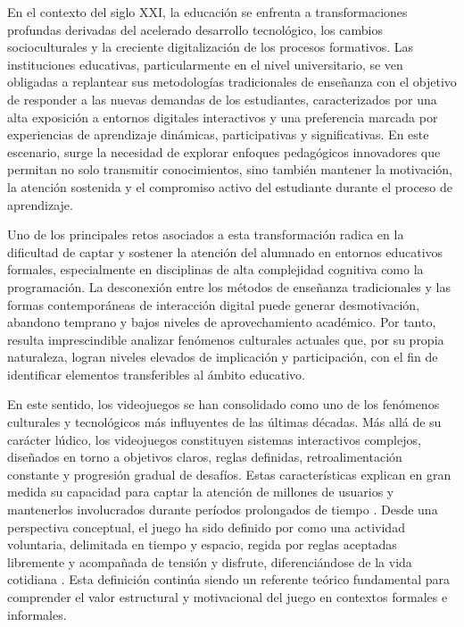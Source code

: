 En el contexto del siglo XXI, la educación se enfrenta a transformaciones profundas derivadas del acelerado desarrollo tecnológico, los cambios socioculturales y la creciente digitalización de los procesos formativos. Las instituciones educativas, particularmente en el nivel universitario, se ven obligadas a replantear sus metodologías tradicionales de enseñanza con el objetivo de responder a las nuevas demandas de los estudiantes, caracterizados por una alta exposición a entornos digitales interactivos y una preferencia marcada por experiencias de aprendizaje dinámicas, participativas y significativas. En este escenario, surge la necesidad de explorar enfoques pedagógicos innovadores que permitan no solo transmitir conocimientos, sino también mantener la motivación, la atención sostenida y el compromiso activo del estudiante durante el proceso de aprendizaje.

Uno de los principales retos asociados a esta transformación radica en la dificultad de captar y sostener la atención del alumnado en entornos educativos formales, especialmente en disciplinas de alta complejidad cognitiva como la programación. La desconexión entre los métodos de enseñanza tradicionales y las formas contemporáneas de interacción digital puede generar desmotivación, abandono temprano y bajos niveles de aprovechamiento académico. Por tanto, resulta imprescindible analizar fenómenos culturales actuales que, por su propia naturaleza, logran niveles elevados de implicación y participación, con el fin de identificar elementos transferibles al ámbito educativo.

En este sentido, los videojuegos se han consolidado como uno de los fenómenos culturales y tecnológicos más influyentes de las últimas décadas. Más allá de su carácter lúdico, los videojuegos constituyen sistemas interactivos complejos, diseñados en torno a objetivos claros, reglas definidas, retroalimentación constante y progresión gradual de desafíos. Estas características explican en gran medida su capacidad para captar la atención de millones de usuarios y mantenerlos involucrados durante períodos prolongados de tiempo \cite{cerezo-pizarro_cultural_2023}. Desde una perspectiva conceptual, el juego ha sido definido por \textcite{Huizinga1950} como una actividad voluntaria, delimitada en tiempo y espacio, regida por reglas aceptadas libremente y acompañada de tensión y disfrute, diferenciándose de la vida cotidiana . Esta definición continúa siendo un referente teórico fundamental para comprender el valor estructural y motivacional del juego en contextos formales e informales.

